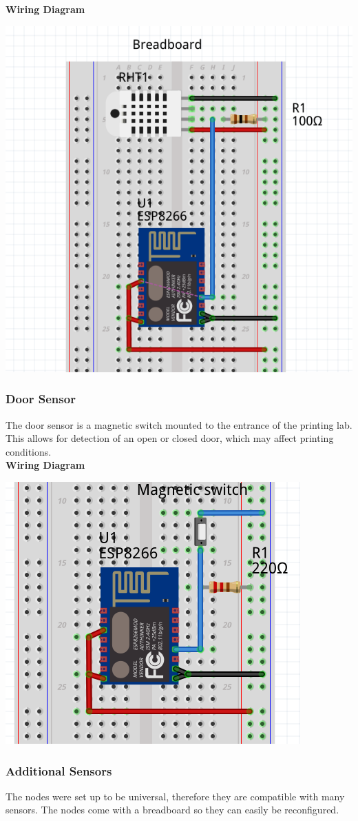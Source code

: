       \textbf{Wiring Diagram}\\
            \begin{center}
      \includegraphics[scale=0.3]{images/temp-diagram.png}
\end{center}

    \subsubsection{Door Sensor}
      The door sensor is a magnetic switch mounted to the entrance of the printing lab.
      This allows for detection of an open or closed door, which may affect printing conditions.\\

      \textbf{Wiring Diagram}\\
      \begin{center}
        \includegraphics[scale=0.3]{images/door-cir.png}
        \end{center}
    \subsubsection{Additional Sensors}
      The nodes were set up to be universal, therefore they are compatible with
      many sensors. The nodes come with a breadboard so they can
      easily be reconfigured.
